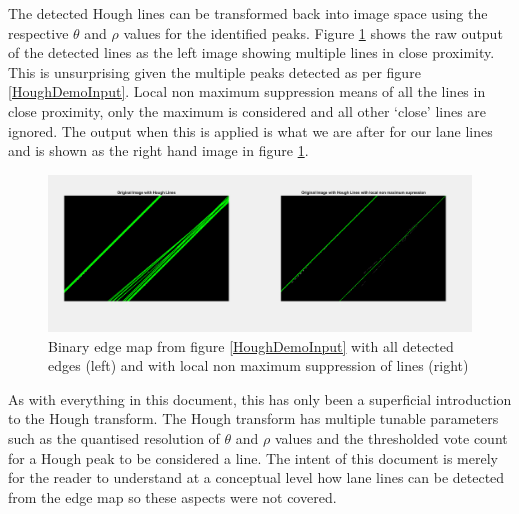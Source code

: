 \documentclass{article}
\begin{document}
	
	The detected Hough lines can be transformed back into image space using the respective $\theta$ and $\rho$ values for the identified peaks. Figure \ref{HoughDemoOutput} shows the raw output of the detected lines as the left image showing multiple lines in close proximity. This is unsurprising given the multiple peaks detected as per figure \ref{HoughDemoInput}. Local non maximum suppression means of all the lines in close proximity, only the maximum is considered and all other `close' lines are ignored. The output when this is applied is what we are after for our lane lines and is shown as the right hand image in figure \ref{HoughDemoOutput}.
	
	\begin{figure}
		\centering
		\includegraphics[width=5.0in]{HoughDemoOutput}
		\caption{Binary edge map from figure \ref{HoughDemoInput} with all detected edges (left) and with local non maximum suppression of lines (right)}
		\label{HoughDemoOutput}
	\end{figure}
	
	
	As with everything in this document, this has only been a superficial introduction to the Hough transform. The Hough transform has multiple tunable parameters such as the quantised resolution of $\theta$ and $\rho$ values and the thresholded vote count for a Hough peak to be considered a line. The intent of this document is merely for the reader to understand at a conceptual level how lane lines can be detected from the edge map so these aspects were not covered.
	
	
\end{document}
